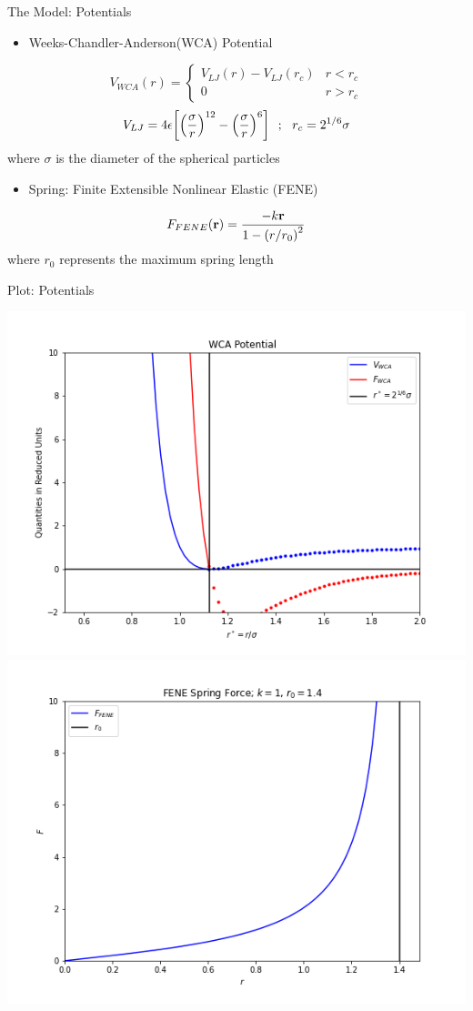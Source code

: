 \documentclass[10pt]{beamer}
\begin{document}
\begin{frame}[label={sec:org4a011f7}]{The Model: Potentials}
\begin{itemize}
\item Weeks-Chandler-Anderson(WCA) Potential
\end{itemize}
\begin{equation}
V_{WCA}(r) = \begin{cases}
V_{LJ}(r) - V_{LJ}(r_c) & r < r_c\\
0 & r > r_c
\end{cases}
\end{equation}
\begin{equation}
V_{LJ} = 4\epsilon\bqty{\pqty{\frac{\sigma}{r}}^{12} - \pqty{\frac{\sigma}{r}}^{6}} \ \ ;\ \ r_c = 2^{1/6}\sigma
\end{equation}
where \(\sigma\) is the diameter of the spherical particles

\begin{itemize}
\item Spring: Finite Extensible Nonlinear Elastic (FENE)
\end{itemize}
\begin{equation}
F_{FENE}(\mathbf{r}) = \frac{- k \mathbf{r}}{1 - \pqty{r / r_0}^2}
\end{equation}
where \(r_0\) represents the maximum spring length
\end{frame}

\begin{frame}[label={sec:org273ed34}]{Plot: Potentials}
\begin{center}
\includegraphics[height=4cm\textwidth]{./WCA.png}
\includegraphics[height=4cm\textwidth]{./FENE.png}
\end{center}
\end{frame}
\end{document}

